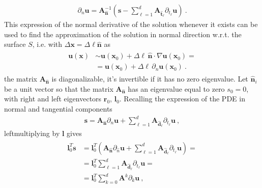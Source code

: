 \documentclass[letterpaper,10pt,english]{jupyterBook}
\begin{document}
\begin{equation*}
\begin{split}\partial_n \mathbf{u} = \mathbf{A}_{\hat{\mathbf{n}}}^{-1} \left( \mathbf{s} - \sum_{\ell=1}^{d} \mathbf{A}_{\hat{\mathbf{t}}_\ell} \partial_{t_\ell} \mathbf{u} \right) \ .\end{split}
\end{equation*}
\sphinxAtStartPar
This expression of the normal derivative of the solution \sphinxhyphen{} whenever it exists \sphinxhyphen{} can be used to find the approximation of the solution in normal direction w.r.t. the surface \(S\), i.e. with \(\Delta \mathbf{x} = \Delta \ell \hat{\mathbf{n}}\) as
\begin{equation*}
\begin{split}\begin{aligned}
  \mathbf{u}(\mathbf{x}) 
  & \sim \mathbf{u}(\mathbf{x}_0) + \Delta \ell \, \hat{\mathbf{n}} \cdot \nabla \mathbf{u}(\mathbf{x}_0) = \\
  & = \mathbf{u}(\mathbf{x}_0) + \Delta \ell \, \partial_{n} \mathbf{u}(\mathbf{x}_0) \ .
\end{aligned}\end{split}
\end{equation*}
\sphinxAtStartPar
{} the matrix \(\mathbf{A}_{\hat{\mathbf{n}}}\) is diagonalizable, it’s invertible if it has no zero eigenvalue. Let \(\hat{\mathbf{n}}_i\) be a unit vector so that the matrix \(\mathbf{A}_{\hat{\mathbf{n}}}\) has an eigenvalue equal to zero \(s_0 = 0\), with right and left eigenvectors \(\mathbf{r}_0\), \(\mathbf{l}_0\). Recalling the expression of the PDE in normal and tangential components
\begin{equation*}
\begin{split}\mathbf{s} = \mathbf{A}_{\hat{\mathbf{n}}} \partial_n \mathbf{u} + \sum_{\ell=1}^{d} \mathbf{A}_{\hat{\mathbf{d}}_\ell} \partial_{t_\ell} \mathbf{u} \ ,\end{split}
\end{equation*}
\sphinxAtStartPar
left\sphinxhyphen{}multiplying by \(\mathbf{l}\) gives
\begin{equation*}
\begin{split}\begin{aligned}
  \mathbf{l}^T_0 \mathbf{s} 
  & = \mathbf{l}_0^T \left( \mathbf{A}_{\hat{\mathbf{n}}} \partial_{\hat{n}} \mathbf{u} + \sum_{\ell=1}^{d} \mathbf{A}_{\hat{\mathbf{d}}_\ell} \partial_{t_\ell} \mathbf{u} \right) = \\
  & = \mathbf{l}_0^T \sum_{\ell=1}^{d} \mathbf{A}_{\hat{\mathbf{d}}_\ell} \partial_{t_\ell} \mathbf{u} = \\
  & = \mathbf{l}_0^T \sum_{k=0}^{d} \mathbf{A}^k \partial_k \mathbf{u} \ ,
\end{aligned}\end{split}
\end{equation*}
\end{document}
